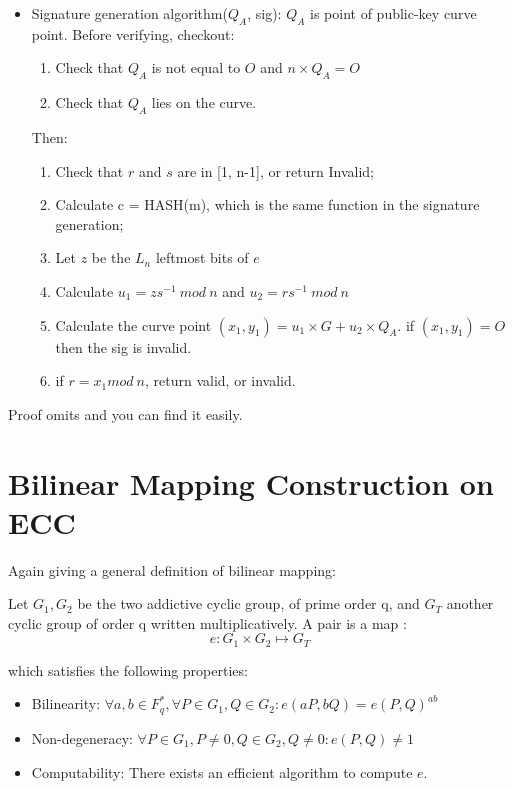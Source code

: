 \documentclass[a4paper,11pt]{article}
\begin{document}
\begin{itemize}
\item Signature generation algorithm($Q_A$, sig):  $Q_A$ is point of public-key curve point.
Before verifying, checkout: 
\begin{enumerate}
\item Check that $Q_A$ is not equal to $O$ and $n \times Q_A = O$
\item Check that $Q_A$ lies on the curve.
\end{enumerate}

Then:
\begin{enumerate}
\item Check that $r$ and $s$ are in [1, n-1], or return Invalid;
\item Calculate c = HASH(m), which is the same function in the signature generation;
\item Let $z$ be the $L_n$ leftmost bits of $e$
\item Calculate $u_1 = zs^{-1}\ mod\ n$  and $u_2 = rs^{-1}\ mod\ n$
\item Calculate the curve point $(x_1, y_1) =  u_1 \times G + u_2 \times Q_A$. if $(x_1, y_1) = O$ then the sig is invalid.
\item if $ r = x_1 mod\ n$, return valid, or invalid.
\end{enumerate}

\end{itemize}
Proof omits and you can find it easily. 


\section{Bilinear Mapping Construction on ECC}
Again giving a general definition of bilinear mapping:

Let $G_1, G_2$ be the two addictive cyclic group, of prime order q, and $G_T$ another cyclic group of order q written multiplicatively. A pair is a map : 
\begin {equation}
e:  G_1 \times G_2  \mapsto G_T
\end{equation}

which satisfies the following properties:

\begin{itemize}
\item Bilinearity: $\forall a, b \in F_q^{*}, \forall P \in G_1, Q \in G_2 : e(aP, bQ) = e(P, Q)^{ab}$
\item Non-degeneracy: $ \forall P \in G_1, P \ne 0, Q \in G_2 , Q \ne 0: e(P, Q) \ne 1$
\item Computability: There exists an efficient algorithm to compute $e$.
\end{itemize}
\end{document}
